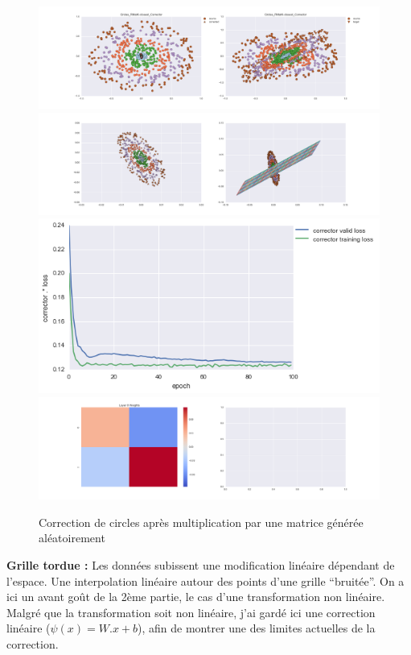 \begin{figure}[H] %
\centering
\includegraphics[width=\linewidth]{fig/24-05-2016/circles/Circles_RMatK-closest_Corrector-DATA.png}
\includegraphics[width=\linewidth]{fig/24-05-2016/circles/Circles_RMatK-closest_Corrector-GridCheck.png}
\includegraphics[width=0.45\linewidth]{fig/24-05-2016/circles/Circles_RMatK-closest_Corrector-Learning_curve.png}
\includegraphics[width=\linewidth]{fig/24-05-2016/circles/Circles_RMatK-closest_Corrector-W.png}
\caption{Correction de circles après multiplication par une matrice générée aléatoirement}
\label{fig:recap-circles-RMat-exhaustive}
\end{figure}

{\Large \textbf{Grille tordue :}} Les données subissent une modification linéaire dépendant de l'espace.
Une interpolation linéaire autour des points d'une grille ``bruitée''.
On a ici un avant goût de la 2ème partie, le cas d'une transformation non linéaire.
Malgré que la transformation soit non linéaire, j'ai gardé ici une correction linéaire ($\psi(x) = W.x+b$),
afin de montrer une des limites actuelles de la correction.

